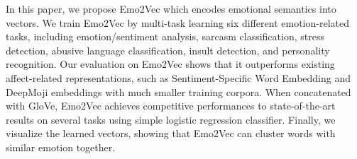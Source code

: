 In this paper, we propose Emo2Vec which encodes emotional semantics into vectors. We train Emo2Vec by multi-task learning six different emotion-related tasks, including emotion/sentiment analysis, sarcasm classification, stress detection, abusive language classification, insult detection, and personality recognition. Our evaluation on Emo2Vec shows that it outperforms existing affect-related representations, such as Sentiment-Specific Word Embedding and DeepMoji embeddings with much smaller training corpora. When concatenated with GloVe, Emo2Vec achieves competitive performances to state-of-the-art results on several tasks using simple logistic regression classifier. Finally, we visualize the learned vectors, showing that Emo2Vec can cluster words with similar emotion together.
